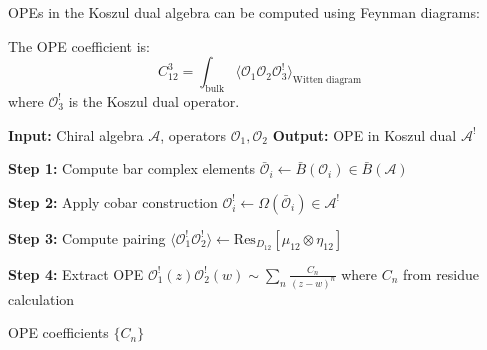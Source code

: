 \begin{technique}\label{tech:diagrams}
OPEs in the Koszul dual algebra can be computed using Feynman diagrams:

\begin{center}
\end{center}

The OPE coefficient is:
$$C_{12}^3 = \int_{\text{bulk}} \langle \mathcal{O}_1 \mathcal{O}_2 \mathcal{O}_3^! \rangle_{\text{Witten diagram}}$$
where $\mathcal{O}_3^!$ is the Koszul dual operator.
\end{technique}

\begin{algorithm}\label{alg:koszul-ope}
\begin{algorithmic}
\STATE \textbf{Input:} Chiral algebra $\mathcal{A}$, operators $\mathcal{O}_1, \mathcal{O}_2$
\STATE \textbf{Output:} OPE in Koszul dual $\mathcal{A}^!$

\STATE \textbf{Step 1:} Compute bar complex elements
\STATE $\bar{\mathcal{O}}_i \gets \bar{B}(\mathcal{O}_i) \in \bar{B}(\mathcal{A})$

\STATE \textbf{Step 2:} Apply cobar construction
\STATE $\mathcal{O}_i^! \gets \Omega(\bar{\mathcal{O}}_i) \in \mathcal{A}^!$

\STATE \textbf{Step 3:} Compute pairing
\STATE $\langle \mathcal{O}_1^! \mathcal{O}_2^! \rangle \gets \text{Res}_{D_{12}}[\mu_{12} \otimes \eta_{12}]$

\STATE \textbf{Step 4:} Extract OPE
\STATE $\mathcal{O}_1^!(z) \mathcal{O}_2^!(w) \sim \sum_n \frac{C_n}{(z-w)^n}$
\STATE where $C_n$ from residue calculation

\RETURN OPE coefficients $\{C_n\}$
\end{algorithmic}
\end{algorithm}

